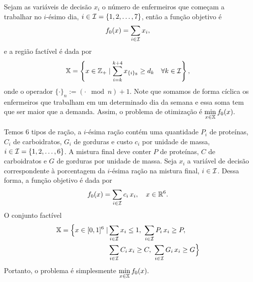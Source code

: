 \begin{questions}
\begin{solution}
	Sejam as variáveis de decisão $x_i$ o número de enfermeiros que começam a trabalhar no $i$-ésimo dia, $i\in\cal{I} = \{1,2,\dots,7\}$, então a função objetivo é
    \[f_0(x) = \sum_{i\in\cal{I}} x_i,\]
    e a região factível é dada por
    \[ \X = \left\lbrace x\in\Z_+ \mid \sum_{i=k}^{k+4} x_{\{i\}_8} \ge d_k\quad \forall k\in\cal{I} \right\rbrace, \]
    onde o operador $\{\cdot\}_n := (\cdot \mod n)+1$. Note que somamos de forma cíclica os enfermeiros que trabalham em um determinado dia da semana e essa soma tem que ser maior que a demanda.
    Assim, o problema de otimização é \(\displaystyle\min_{x\in\X} f_0(x).\)
\end{solution}

\begin{solution}
	Temos 6 tipos de ração, a $i$-ésima ração contém uma quantidade $P_i$ de proteínas, $C_i$ de carboidratos, $G_i$ de gorduras e custo $c_i$ por unidade de massa, $i \in \cal{I} = \{1,2,\dots,6\}$. A mistura final deve conter $P$ de proteínas, $C$ de carboidratos e $G$ de gorduras por unidade de massa. Seja $x_i$ a variável de decisão correspondente à porcentagem da $i$-ésima ração na mistura final, $i\in\cal{I}$. Dessa forma, a função objetivo é dada por
    \[f_0(x) = \sum_{i\in\cal{I}} c_i\,x_i, \quad x\in\R^6.\]
O conjunto factível
\begin{align*}
	\X = \Big\{ x\in[0,1]^6 \mid & \sum_{i\in\cal{I}} x_i \le 1,~
    		\sum_{i\in\cal{I}} P_i\,x_i \ge P,\\
        & \sum_{i\in\cal{I}} C_i\,x_i \ge C,~
        	\sum_{i\in\cal{I}} G_i\,x_i \ge G
    \Big\}
\end{align*}
Portanto, o problema é simplesmente \(\displaystyle\min_{x\in\X} f_0(x).\)
\end{solution}


\end{questions}
